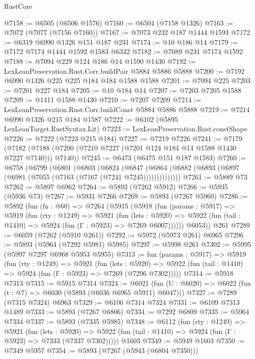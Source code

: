 \begin{lexlean}{RustCore}
\begin{coremodule}
@7158 := @6505 (@6506 @1576)
@7160 := @6504 (@7158 @1326)
@7163 := @7072 (@7077 (@7156 @7160))
@7167 := @7073 @232 @187 @1444 @1593
@7172 := @6319 @6990 @1326 @151 @187 @231
@7174 := @10 @186 @14
@7179 := @7172 @7174 @1444 @1592 @1583 @6332
@7182 := @7089 @231 @7174 @1592
@7188 := @7094 @229 @124 @186 @14 @1590 @1430
@7192 := LexLeanPreservation.Rust.Corr.buildPair @5884 @5886 @5888
@7200 := @7192 @6990 @1326 @225 @225 @184 @184 @1588 @1588
@7201 := @7094 @225
@7203 := @7201 @227 @184
@7205 := @10 @184 @14
@7207 := @7203 @7205 @1588
@7209 := @1411 @1588 @1430
@7210 := @7207 @7209
@7214 := LexLeanPreservation.Rust.Corr.buildConst @5884 @5886 @5888
@7219 := @7214 @6990 @1326 @215 @184 @1587
@7222 := @6102 (@5895 LexLeanTarget.RustSyntax.Lit)
@7223 := LexLeanPreservation.Rust.constShape
@7226 := @7222 (@7223 @215 @184)
@7227 := @7219 @7226
@7241 := @7179
    (@7182 (@7188 (@7200 (@7210 @7227 (@7201 @124 @184 @14 @1588 @1430 @7227 @7140))) @7140))
@7245 := @6473 (@6475 @151 @187 @1583)
@7260 := @6758
    (@6799
      (@6801
        (@6803
          (@6824
            (@6847
              (@6864 (@6882 (@6893 (@6897 (@6981 (@7055 (@7163 (@7167 (@7241 @7245))))))))))))))
@7261 := @5889 @73
@7262 := @5897 @6962
@7264 := @5893 (@7262 @5912)
@7266 := @5935 (@5936 @73)
@7267 := @5931 @7266
@7269 := @5893 (@7267 @5960)
@7286 := @5892
    (fun (fn : @60) =>
    @7264
      (@5915
        (@5918
          (fun (params : @5917) =>
          @5919
            (fun (rty : @1249) =>
            @5921
              (fun (lets : @5920) =>
              @5922 (fun (tail : @1410) => @5924 (fun (Γ : @5923) => @7269 @6007))))))
        @6053))
    @261
@7289 := @6059 (@7262 (@5910 @261))
@7292 := @5972 (@5973 @261) @6965
@7296 := @5893 (@5964 (@7292 @5981) @5985)
@7297 := @5998 @261
@7302 := @5995 (@5997 @7297 @6968 @5953 @5955)
@7313 := fun (params : @5917) =>
  @5919
    (fun (rty : @1249) =>
    @5921
      (fun (lets : @5920) =>
      @5922 (fun (tail : @1410) => @5924 (fun (Γ : @5923) => @7269 (@7296 @7302)))))
@7314 := @5918 @7313
@7315 := @5915 @7314
@7324 := @6021 (fun (U : @6020) => @6022 (fun (t : @7) => @6030 (@5893 (@6036 @6965 @5911) @6047)))
@7327 := @7289 (@7315 @7324) @6963
@7329 := @6106 @7314 @7324
@7331 := @6109 @7313 @1489
@7333 := @5893 (@7267 @6806)
@7334 := @7292 @6809
@7335 := @5964 @7334
@7337 := @5893 (@7335 @5985)
@7348 := @6112
    (fun (rty : @1249) =>
    @5921
      (fun (lets : @5920) =>
      @5922 (fun (tail : @1410) => @5924 (fun (Γ : @5923) => @7333 (@7337 @7302)))))
    @1603
@7349 := @5949 @1603
@7350 := @7349 @5957
@7354 := @5893 (@7267 (@5943 (@6804 @7350)))

\end{coremodule}
\end{lexlean}
